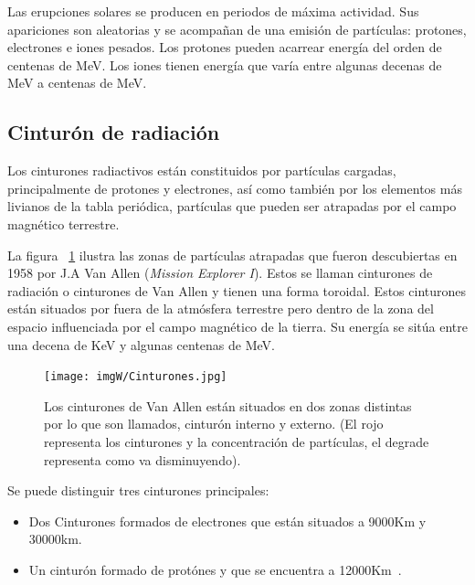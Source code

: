 \documentclass[a4paper,openright,12pt]{report}
\begin{document}
Las erupciones solares se producen en periodos de máxima actividad. Sus apariciones son aleatorias y se acompañan de una emisión de partículas:  protones,  electrones e  iones pesados. Los protones pueden acarrear energía del orden de centenas de MeV. Los iones tienen energía que varía entre algunas decenas de MeV a centenas de MeV.
\pagebreak
\subsection{Cinturón de radiación }

Los cinturones radiactivos están constituidos por partículas cargadas, principalmente de protones y  electrones, así como también por los  elementos más livianos de la tabla periódica, partículas que pueden ser atrapadas por el campo magnético terrestre. 

La figura ~\ref{Cinturones} ilustra las zonas de partículas atrapadas que fueron descubiertas en 1958 por J.A Van Allen (\textit{Mission Explorer I}). Estos se llaman cinturones de radiación o cinturones de Van Allen y tienen una forma toroidal. Estos cinturones están situados por fuera de la atmósfera terrestre pero dentro de la zona del espacio influenciada por el campo magnético de la tierra. Su energía se sitúa entre una decena de KeV y algunas centenas de MeV.



\begin{figure}[H]
	\centering
	\texttt{[image: imgW/Cinturones.jpg]}
	\caption{Los cinturones de Van Allen están situados en dos zonas distintas por lo que son llamados, cinturón interno y externo. (El rojo representa los cinturones y la concentración de partículas, el degrade representa como va disminuyendo). } \cite{NASA3}
	\label{Cinturones}
\end{figure}

Se puede distinguir tres cinturones principales:
\begin{itemize}
  \item Dos Cinturones formados de electrones que están situados a 9000Km y 30000km.
  \item Un cinturón formado de protónes y que se encuentra a 12000Km~\cite{boudenottenue}.
\end{itemize} 
\end{document}
